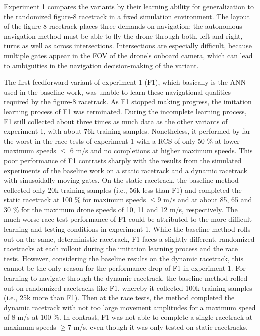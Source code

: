 Experiment 1 compares the variants by their learning ability
for generalization to the randomized figure-8 racetrack in a fixed simulation environment.
The layout of the figure-8 racetrack places three demands on navigation:
the autonomous navigation method must be able to 
fly the drone through both, left and right, turns as well as across intersections.
Intersections are especially difficult,
because multiple gates appear in the FOV of the drone's onboard camera, 
which can lead to ambiguities in the navigation decision-making of the variant.

The first feedforward variant of experiment 1 (F1),
which basically is the ANN used in the baseline work,
was unable to learn these navigational qualities required by the figure-8 racetrack.
As F1 stopped making progress, the imitation learning process of F1 was terminated.
During the incomplete learning process, F1 still collected
about three times as much data as the other variants of experiment 1,
with about 76k training samples.
Nonetheless, it performed by far the worst in the race tests of experiment 1
with a RCS of only 50 \% at lower maximum speeds $\le$ 6 m/s
and no completions at higher maximum speeds.
This poor performance of F1 contrasts sharply with the results 
from the simulated experiments of the baseline work
on a static racetrack and a dynamic racetrack with sinusoidally moving gates.
On the static racetrack,
the baseline method collected only 20k training samples (i.e., 56k less than F1)
and completed the static racetrack at 100 \%
for maximum speeds $\le 9$ m/s 
and at about 85, 65 and 30 \%
for the maximum drone speeds of 10, 11 and 12 m/s, respectively.
The much worse race test performance of F1
could be attributed to the more difficult learning and testing conditions in experiment 1.
While the baseline method rolls out on the same, deterministic racetrack,
F1 faces a slightly different, randomized racetracks at each rollout during 
the imitation learning process and the race tests.
However, considering the baseline results on the dynamic racetrack, 
this cannot be the only reason for the performance drop of F1 in experiment 1.
For learning to navigate through the dynamic racetrack, 
the baseline method rolled out on randomized racetracks like F1,
whereby it collected 100k training samples (i.e., 25k more than F1).
Then at the race tests,
the method completed the dynamic racetrack
with not too large movement amplitudes
for a maximum speed of 8 m/s at 100 \%.
In contrast, F1 was not able to complete a single racetrack
at maximum speeds $\ge 7$ m/s,
even though it was only tested on static racetracks.
